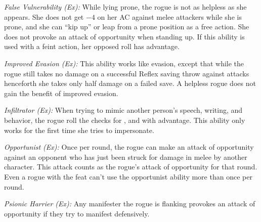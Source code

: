 
\textit{False Vulnerability (Ex):} While lying prone, the rogue is not as helpless as she appears. She does not get $-4$ on her AC against melee attackers while she is prone, and she can ``kip up'' or leap from a prone position as a free action. She does not provoke an attack of opportunity when standing up. If this ability is used with a feint action, her opposed  roll has advantage.

\textit{Improved Evasion (Ex):} This ability works like evasion, except that while the rogue still takes no damage on a successful Reflex saving throw against attacks henceforth she takes only half damage on a failed save. A helpless rogue does not gain the benefit of improved evasion.

\textit{Infiltrator (Ex):} When trying to mimic another person's speech, writing, and behavior, the rogue roll the checks for ,  and  with advantage. This ability only works for the first time she tries to impersonate.



\textit{Opportunist (Ex):} Once per round, the rogue can make an attack of opportunity against an opponent who has just been struck for damage in melee by another character. This attack counts as the rogue's attack of opportunity for that round. Even a rogue with the  feat can't use the opportunist ability more than once per round.

\textit{Psionic Harrier (Ex):} Any manifester the rogue is flanking provokes an attack of opportunity if they try to manifest defensively.

